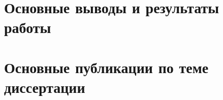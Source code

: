 \section*{Основные выводы и результаты работы}

\todo{}


\section*{Основные публикации по теме диссертации}

\begin{refsection}
\nocite{*}
\printbibliography[
    keyword=own,
    heading=none,
    resetnumbers=true
]
\end{refsection}
